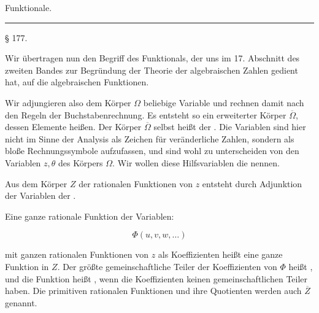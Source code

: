 \begin{center}

Funktionale.

\rule{4cm}{0.4pt}
\end{center}

\begin{center}
§ 177. 
\end{center}

Wir übertragen nun den Begriff des Funktionals, der uns im
17. Abschnitt des zweiten Bandes zur Begründung der Theorie
der algebraischen Zahlen gedient hat, auf die algebraischen Funktionen.

Wir adjungieren also dem Körper $\Omega$ beliebige Variable und
rechnen damit nach den Regeln der Buchstabenrechnung. Es
entsteht so ein erweiterter Körper $\overline{\Omega}$, dessen Elemente 
 heißen. Der Körper $\overline{\Omega}$ selbst heißt der .
 Die Variablen sind hier nicht im Sinne der Analysis
als Zeichen für veränderliche Zahlen, sondern als bloße Rechnungssymbole
 aufzufassen, und sind wohl zu unterscheiden von den
Variablen $z, \theta$ des Körpers $\Omega$. Wir wollen diese Hilfsvariablen
die  nennen.

Aus dem Körper $Z$ der rationalen Funktionen von $z$ entsteht
durch Adjunktion der Variablen der .

Eine ganze rationale Funktion der Variablen:

\[
\Phi(u, v, w, \ldots)
\]

mit ganzen rationalen Funktionen von $z$ als Koeffizienten heißt
eine ganze Funktion in $Z$. Der größte gemeinschaftliche Teiler
der Koeffizienten von $\Phi$ heißt , und
die Funktion heißt , wenn die Koeffizienten keinen gemeinschaftlichen
 Teiler haben. Die primitiven rationalen Funktionen
 und ihre Quotienten werden auch 
$\overline{Z}$ genannt.
